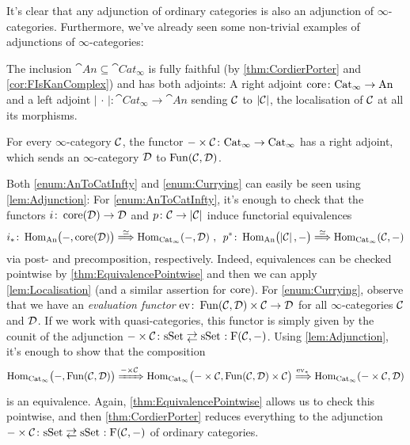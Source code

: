 \begin{exm}\label{exm:Adjunctions}
	It's clear that any adjunction of ordinary categories is also an adjunction of $\infty$-categories. Furthermore, we've already seen some non-trivial examples of adjunctions of $\infty$-categories:
	\begin{alphanumerate}
		\item The inclusion $\cat{An}\subseteq \cat{Cat}_\infty$ is fully faithful (by \cref{thm:CordierPorter} and \cref{cor:FIsKanComplex}) and has both adjoints: A right adjoint $\operatorname{core}\colon \mathrm{Cat}_\infty\rightarrow \mathrm{An}$ and a left adjoint $\left|\,\cdot\,\right|\colon \cat{Cat}_\infty\rightarrow \cat{An}$ sending $\mathcal{C}$ to $\left|\mathcal{C}\right|$, the localisation of $\mathcal{C}$ at all its morphisms.\label{enum:AnToCatInfty}
		\item For every $\infty$-category $\mathcal{C}$, the functor $-\times \mathcal{C}\colon \mathrm{Cat}_\infty\rightarrow \mathrm{Cat}_\infty$ has a right adjoint, which sends an $\infty$-category $\mathcal{D}$ to $\operatorname{Fun}(\mathcal{C},\mathcal{D})$.\label{enum:Currying}
	\end{alphanumerate}
	Both \cref{enum:AnToCatInfty} and \cref{enum:Currying} can easily be seen using \cref{lem:Adjunction}: For \cref{enum:AnToCatInfty}, it's enough to check that the functors $i\colon \operatorname{core}(\mathcal{D})\rightarrow \mathcal{D}$ and $p\colon \mathcal{C}\rightarrow \left|\mathcal{C}\right|$ induce functorial equivalences
	\begin{equation*}
		i_*\colon \Hom_{\cat{An}}\lef(-,\core(\Dd)\righ)\overset{\simeq}{\Longrightarrow}\Hom_{\cat{Cat}_\infty}\!\left(-,\Dd\right)\,,\ \,p^*\colon \Hom_{\cat{An}}\lef(\left|\Cc\right|,-\righ)\overset{\simeq}{\Longrightarrow}\Hom_{\cat{Cat}_\infty}\!\left(\Cc,-\right)
	\end{equation*}
	via post- and precomposition, respectively. Indeed, equivalences can be checked pointwise by \cref{thm:EquivalencePointwise} and then we can apply \cref{lem:Localisation} (and a similar assertion for $\operatorname{core}$). For \cref{enum:Currying}, observe that we have an \emph{evaluation functor} $\operatorname{ev}\colon \operatorname{Fun}(\mathcal{C},\mathcal{D})\times\mathcal{C}\rightarrow \mathcal{D}$ for all $\infty$-categories $\mathcal{C}$ and $\mathcal{D}$. If we work with quasi-categories, this functor is simply given by the counit of the adjunction $-\times\Cc\colon\cat{sSet}\shortdoublelrmorphism \cat{sSet}\noloc \F(\Cc,-)$. Using \cref{lem:Adjunction}, it's enough to show that the composition
	\begin{equation*}
		\Hom_{\cat{Cat}_\infty}\lef(-,\Fun(\Cc,\Dd)\righ)\xRightarrow{-\times\Cc\vphantom{_y}}\Hom_{\cat{Cat}_\infty}\lef(-\times\Cc,\Fun(\Cc,\Dd)\times\Cc\righ)\overset{\ev_*\vphantom{_y}}{\Longrightarrow}\Hom_{\cat{Cat}_\infty}\!\left(-\times\Cc,\Dd\right)
	\end{equation*}
	is an equivalence. Again, \cref{thm:EquivalencePointwise} allows us to check this pointwise, and then \cref{thm:CordierPorter} reduces everything to the  adjunction $-\times\Cc\colon\cat{sSet}\shortdoublelrmorphism \cat{sSet}\noloc \F(\Cc,-)$ of ordinary categories.
	

\end{exm}
